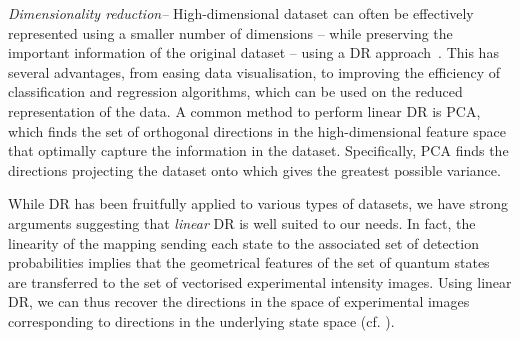 \textit{Dimensionality reduction--} High-dimensional dataset can often be effectively represented using a smaller number of dimensions -- while preserving the important information of the original dataset -- using a DR approach~\cite{cord2008machine,fodor2002survey}. This has several advantages, from easing data visualisation, to improving the efficiency of classification and regression algorithms, which can be used on the reduced representation of the data. %
A common method to perform linear DR is \ac{PCA}, which finds the set of orthogonal directions in the high-dimensional feature space that optimally capture the information in the dataset. Specifically, \ac{PCA} finds the directions projecting the dataset onto which gives the greatest possible variance.

While DR has been fruitfully applied to various types of datasets, we have strong arguments suggesting that \emph{linear} DR is well suited to our needs.
In fact, the linearity of the mapping sending each state to the associated set of detection probabilities implies that the geometrical features of the set of quantum states are transferred to the set of vectorised experimental intensity images. Using {linear} DR, we can thus recover the directions in the space of experimental images corresponding to directions in the underlying state space (cf. \cite{SI}).

